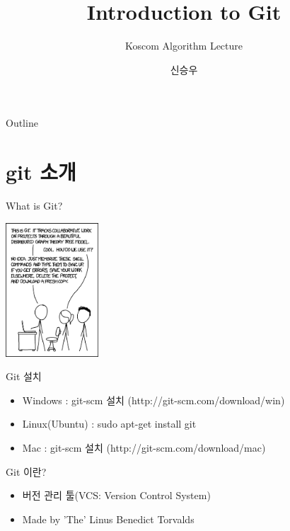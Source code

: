\documentclass{beamer}
\title{Introduction to Git}
\subtitle{Koscom Algorithm Lecture}
\author{신승우}
\begin{document}
\begin{frame}
  \titlepage
\end{frame}

\begin{frame}{Outline}
  \tableofcontents
\end{frame}



\section{git 소개} 

\begin{frame}{What is Git?} 
\begin{center}
\includegraphics[height=5cm,keepaspectratio]{xkcd}
\end{center}
\end{frame}

\begin{frame}{Git 설치}

\begin{itemize} 
\item Windows : git-scm 설치 (http://git-scm.com/download/win)
\item Linux(Ubuntu) : sudo apt-get install git
\item Mac : git-scm 설치 (http://git-scm.com/download/mac)
\end{itemize}
\end{frame}

\begin{frame}{Git 이란?}
\begin{itemize}
\item 버전 관리 툴(VCS: Version Control System)
\item Made by 'The' Linus Benedict Torvalds
\end{itemize}
\end{frame}
\end{document}
